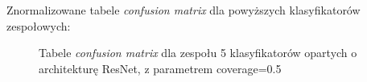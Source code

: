 \documentclass[polish,12pt]{aghthesis}
\begin{document}
\noindent Znormalizowane tabele \textit{confusion matrix} dla powyższych klasyfikatorów zespołowych:
\begin{figure}[H]%
    \begin{adjustbox}{minipage=1.0\paperwidth, pagecenter}
    \centering
    \qquad
    \end{adjustbox}
    \label{fig:resnet-ens-5-0.5-matrices}
    \caption{Tabele \textit{confusion matrix} dla zespołu 5 klasyfikatorów opartych o architekturę ResNet, z parametrem coverage=0.5}
\end{figure}
\end{document}
